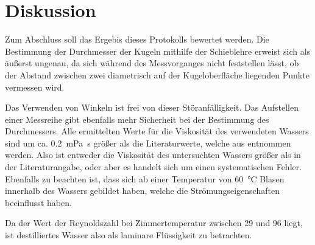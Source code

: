 
\section{Diskussion}
Zum Abschluss soll das Ergebis dieses Protokolls bewertet werden.
Die Bestimmung der Durchmesser der Kugeln mithilfe der Schieblehre
erweist sich als äußerst ungenau, da sich während des Messvorganges
nicht feststellen lässt, ob der Abstand zwischen zwei diametrisch auf
der Kugeloberfläche liegenden Punkte vermessen wird.

Das Verwenden von Winkeln ist frei von dieser Störanfälligkeit. Das
Aufstellen einer Messreihe gibt ebenfalls mehr Sicherheit bei der
Bestimmung des Durchmessers.  Alle ermittelten Werte für die Viskosität
des verwendeten Wassers sind um ca. \SI{0.2}{\milli\pascal\second}
größer als die Literaturwerte, welche aus \textcite{demtroeder-1}
entnommen werden. Also ist entweder die Viskosität des untersuchten
Wassers größer als in der Literaturangabe, oder aber es handelt sich um
einen systematischen Fehler. Ebenfalls zu beachten ist, dass sich ab
einer Temperatur von \SI{60}{\celsius} Blasen innerhalb des Wassers
gebildet haben, welche die Strömungseigenschaften beeinflusst haben.

Da der Wert der Reynoldszahl bei Zimmertemperatur zwischen 29 und 96
liegt, ist destilliertes Wasser also als laminare Flüssigkeit zu
betrachten.
